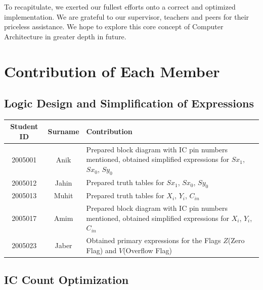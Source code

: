 \documentclass{article}
\begin{document}
\vspace{2mm}

To recapitulate, we exerted our fullest efforts onto a correct and optimized implementation. We are grateful to our supervisor, teachers and peers for their priceless assistance. We hope to explore this core concept of Computer Architecture in greater depth in future.



 
\newpage

\section{Contribution of Each Member}



\subsection{Logic Design and Simplification of Expressions}



\begin{table}[h]
    \centering
\begin{tabular}{|c|c|m{10cm}|}
\hline
Student ID & Surname & Contribution \\ \hline
2005001    & Anik    & Prepared block diagram with IC pin numbers mentioned, obtained simplified expressions for $Sx_1$, $Sx_0$, $Sy_0$             \\ \hline
2005012    & Jahin   &  Prepared truth tables for $Sx_1$, $Sx_0$, $Sy_0$             \\ \hline
2005013    & Muhit   &  Prepared truth tables for $X_i$, $Y_i$, $C_{in}$            \\ \hline
2005017    & Amim    &  Prepared block diagram with IC pin numbers mentioned, obtained simplified expressions for  $X_i$, $Y_i$, $C_{in}$      \\ \hline
2005023    & Jaber   &  Obtained primary expressions for the Flags $Z$(Zero Flag) and $V$(Overflow Flag)     \\ \hline
\end{tabular}
\end{table}



\subsection{IC Count Optimization}
\end{document}

